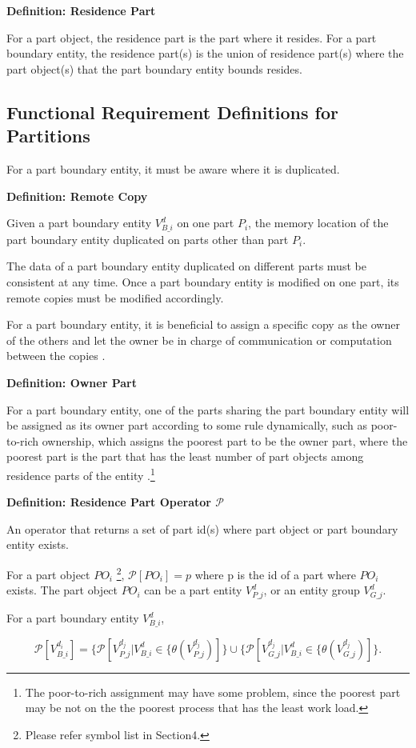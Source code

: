 \textbf{Definition: Residence Part} 

For a part object, the residence part is the part where it
resides. For a part boundary entity, the residence part(s) is the
union of residence part(s) where the part object(s) that the part
boundary entity bounds resides. 


\subsection{Functional Requirement Definitions for Partitions}

For a part boundary entity, it must be aware where it is
duplicated. 

\textbf{Definition: Remote Copy} 

Given a part boundary entity $V^d_{B\_i}$ on one part $P_i$, the
memory location of
the part boundary entity duplicated on parts other than part $P_i$. 

The data of a part boundary entity duplicated on
different parts must be consistent at any time. Once a part boundary
entity is
modified on one part, its remote copies must be modified
accordingly.


For a part boundary entity, it is beneficial to assign a specific copy
as the owner of the others and let the owner be in charge of
communication or computation between the copies \cite{Seol}. 

\textbf{Definition: Owner Part}

For a part boundary entity, one of the parts sharing the part boundary
entity
will be assigned as its owner part according to some rule dynamically,
such as poor-to-rich ownership, which assigns the poorest part to be
the owner part, where the poorest part is the part that has the least
number of part objects among residence parts of the entity
\cite{Seol}.\footnote{The poor-to-rich assignment may have some problem, since
the poorest part may be not on the the poorest process that has the
least work load.}

\textbf{Definition: Residence Part Operator $\mathcal{P}$} 

An operator that returns a set of part id(s) where part object or part
boundary entity exists. 

For a part object $PO_i$ \footnote{Please refer symbol list in Section4.}, $\mathcal{P}[PO_i]={p}$ where p is the
id of a part where $PO_i$ exists. The part object $PO_i$ can be a part
entity $V^d_{P\_j}$, or an entity group $V^d_{G\_j}$.

For a part boundary entity $V^d_{B\_i}$, 

\begin{equation}
\mathcal{P}[V^{d_i}_{B\_i}]=\{\mathcal{P}[V^{d_j}_{P\_j}|V^d_{B\_i}\in\{\theta(V^{d_j}_{P\_j})]\}\cup\{\mathcal{P}[V^{d_j}_{G\_j}|V^d_{B\_i}\in\{\theta(V^{d_j}_{G\_j})]\}.  
\end{equation}
